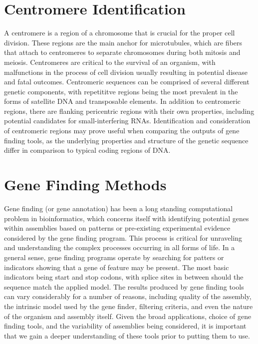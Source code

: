 \section{Centromere Identification}
A centromere is a region of a chromosome that is crucial for the
proper cell division. These regions are the main anchor for
microtubules, which are fibers that attach to centromeres to separate
chromosomes during both mitosis and meiosis. Centromeres are critical
to the survival of an organism, with malfunctions in the process of
cell division usually resulting in potential disease and fatal
outcomes\cite{Plohl2014}. Centromeric sequences can be comprised of
several different genetic components, with repetititve regions being
the most prevalent in the forms of satellite DNA and transposable
elements. In addition to centromeric regions, there are flanking
pericentric regions with their own properties, including potential
candidates for small-interfering RNAs\cite{Plohl2014}. Identification
and consideration of centromeric regions may prove useful when
comparing the outputs of gene finding tools, as the underlying
properties and structure of the genetic sequence differ in comparison
to typical coding regions of DNA.

\section{Gene Finding Methods}
Gene finding (or gene annotation) has been a long standing
computational problem in bioinformatics, which concerns itself with
identifying potential genes within assemblies based on patterns or
pre-existing experimental evidence considered by the gene finding
program. This process is critical for unraveling and understanding the
complex processes occurring in all forms of life. In a general sense,
gene finding programs operate by searching for patters or indicators
showing that a gene of feature may be present. The most basic
indicators being start and stop codons, with splice sites in
between should the sequence match the applied model. The results
produced by gene finding tools can vary considerably for a number of
reasons, including quality of the assembly, the intrinsic model used
by the gene finder, filtering criteria, and even the nature of the
organism and assembly itself. Given the broad applications, choice of
gene finding tools, and the variability of assemblies being
considered, it is important that we gain a deeper understanding of
these tools prior to putting them to use.

